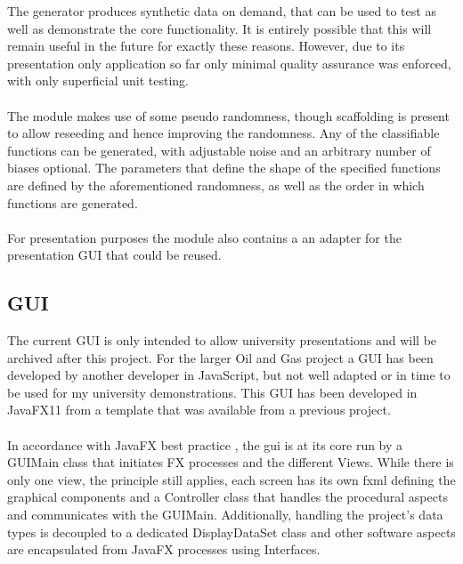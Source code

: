 \documentclass[main.tex]{subfiles}
\begin{document}
      The generator produces synthetic data on demand, that can be used to test as well as demonstrate the core functionality. It is entirely possible that this will remain useful in the future for exactly these reasons. However, due to its presentation only application so far only minimal quality assurance was enforced, with only superficial unit testing.
      \\\\
      The module makes use of some pseudo randomness, though scaffolding is present to allow reseeding and hence improving the randomness. Any of the classifiable functions can be generated, with adjustable noise and an arbitrary number of biases optional. The parameters that define the shape of the specified functions are defined by the aforementioned randomness, as well as the order in which functions are generated.
      \\\\
      For presentation purposes the module also contains a an adapter for the presentation GUI that could be reused.
      
    \subsection{GUI}
      
      The current GUI is only intended to allow university presentations and will be archived after this project. For the larger Oil and Gas project a GUI has been developed by another developer in JavaScript, but not well adapted or in time to be used for my university demonstrations. This GUI has been developed in JavaFX11 from a template that was available from a previous project.
      \\\\
      In accordance with JavaFX best practice \cite{},  the gui is at its core run by a GUIMain class that initiates FX processes and the different Views. While there is only one view, the principle still applies, each screen has its own fxml defining the graphical components and a Controller class that handles the procedural aspects and communicates with the GUIMain. Additionally, handling the project's data types is decoupled to a dedicated DisplayDataSet class and other software aspects are encapsulated from JavaFX processes using Interfaces.
      
\end{document}

